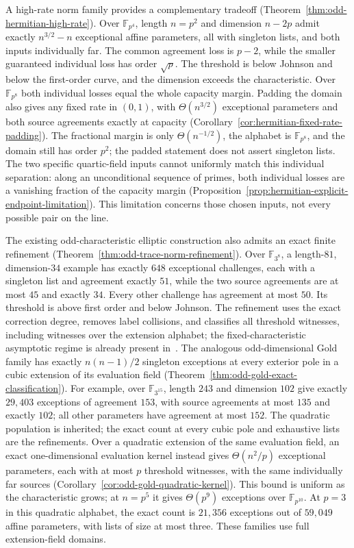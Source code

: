 \documentclass[11pt,letterpaper]{article}
\theoremstyle{definition}
\theoremstyle{remark}
\begin{document}
A high-rate norm family provides a complementary tradeoff
(Theorem~\ref{thm:odd-hermitian-high-rate}). Over $\mathbb F_{p^4}$,
length $n=p^2$ and dimension $n-2p$ admit exactly $n^{3/2}-n$ exceptional
affine parameters, all with singleton lists, and both inputs individually far. The common
agreement loss is $p-2$, while the smaller guaranteed individual
loss has order $\sqrt p$. The threshold is below Johnson and below
the first-order curve, and the dimension exceeds the characteristic.
Over $\mathbb F_{p^8}$ both individual losses equal the whole capacity
margin. Padding the domain also gives any fixed rate in $(0,1)$,
with $\Theta(n^{3/2})$ exceptional parameters and both source agreements
exactly at capacity (Corollary~\ref{cor:hermitian-fixed-rate-padding}).
The fractional margin is only $\Theta(n^{-1/2})$, the alphabet is
$\mathbb F_{p^8}$, and the domain still has order $p^2$; the padded
statement does not assert singleton lists.
The two specific quartic-field inputs cannot uniformly match this
individual separation: along an unconditional sequence of primes,
both individual losses are a vanishing fraction of the capacity margin
(Proposition~\ref{prop:hermitian-explicit-endpoint-limitation}).
This limitation concerns those chosen inputs, not every possible pair
on the line.

The existing odd-characteristic elliptic construction also admits an
exact finite refinement (Theorem~\ref{thm:odd-trace-norm-refinement}).
Over $\mathbb F_{3^8}$, a length-$81$, dimension-$34$ example has
exactly $648$ exceptional challenges, each with a singleton list and
agreement exactly $51$, while the two source agreements are at most
$45$ and exactly $34$. Every other challenge has agreement at most $50$.
Its threshold is above first order and below Johnson. The refinement
uses the exact correction degree, removes label collisions, and classifies
all threshold witnesses, including witnesses over the extension alphabet;
the fixed-characteristic asymptotic regime is already present
in~\cite{binary-counterexamples}.
The analogous odd-dimensional Gold family has exactly $n(n-1)/2$
singleton exceptions at every exterior pole in a cubic extension of
its evaluation field (Theorem~\ref{thm:odd-gold-exact-classification}).
For example, over $\mathbb F_{3^{15}}$, length $243$ and dimension $102$
give exactly $29{,}403$ exceptions of agreement $153$, with source
agreements at most $135$ and exactly $102$; all other parameters have
agreement at most $152$. The quadratic population is inherited;
the exact count at every cubic pole and exhaustive lists are the
refinements. Over a quadratic extension of the same evaluation field,
an exact one-dimensional evaluation kernel instead gives
$\Theta(n^2/p)$ exceptional parameters, each with at most $p$ threshold
witnesses, with the same individually far sources
(Corollary~\ref{cor:odd-gold-quadratic-kernel}).
This bound is uniform as the characteristic grows; at $n=p^5$ it gives
$\Theta(p^9)$ exceptions over $\mathbb F_{p^{10}}$.
At $p=3$ in this quadratic alphabet, the exact count is $21{,}356$
exceptions out of $59{,}049$ affine parameters, with lists of size
at most three. These families use full extension-field domains.
\end{document}
